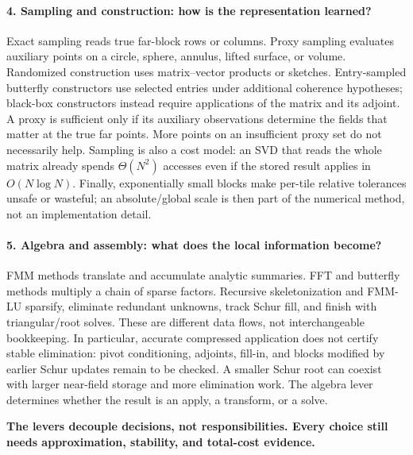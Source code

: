 \documentclass[11pt,a4paper]{article}
\begin{document}
\paragraph{4. Sampling and construction: how is the representation learned?}
Exact sampling reads true far-block rows or columns. Proxy sampling evaluates auxiliary points on a circle, sphere, annulus, lifted surface, or volume. Randomized construction uses matrix--vector products or sketches. Entry-sampled butterfly constructors use selected entries under additional coherence hypotheses; black-box constructors instead require applications of the matrix and its adjoint. A proxy is sufficient only if its auxiliary observations determine the fields that matter at the true far points. More points on an insufficient proxy set do not necessarily help. Sampling is also a cost model: an SVD that reads the whole matrix already spends $\Theta(N^2)$ accesses even if the stored result applies in $O(N\log N)$. Finally, exponentially small blocks make per-tile relative tolerances unsafe or wasteful; an absolute/global scale is then part of the numerical method, not an implementation detail.

\paragraph{5. Algebra and assembly: what does the local information become?}
FMM methods translate and accumulate analytic summaries. FFT and butterfly methods multiply a chain of sparse factors. Recursive skeletonization and FMM-LU sparsify, eliminate redundant unknowns, track Schur fill, and finish with triangular/root solves. These are different data flows, not interchangeable bookkeeping. In particular, accurate compressed application does not certify stable elimination: pivot conditioning, adjoints, fill-in, and blocks modified by earlier Schur updates remain to be checked. A smaller Schur root can coexist with larger near-field storage and more elimination work. The algebra lever determines whether the result is an apply, a transform, or a solve.

\begin{center}
\colorbox{light}{\parbox{0.95\linewidth}{\vspace{4pt}\centering
\textbf{The levers decouple decisions, not responsibilities. Every choice still needs approximation, stability, and total-cost evidence.}\vspace{4pt}}}
\end{center}
\end{document}
